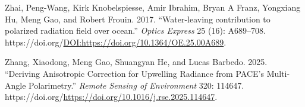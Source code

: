 \documentclass[
  letterpaper,
  open=any]{scrbook}
\newlength{\cslhangindent}
\newenvironment{CSLReferences}[2] %
 {\begin{list}{}{%
  \setlength{\itemindent}{0pt}
  \setlength{\leftmargin}{0pt}
  \setlength{\parsep}{0pt}
  \ifodd #1
   \setlength{\leftmargin}{\cslhangindent}
   \setlength{\itemindent}{-1\cslhangindent}
  \fi
  \setlength{\itemsep}{#2\baselineskip}}}
 {\end{list}}
\begin{document}
\begin{CSLReferences}{1}{0}
Zhai, Peng-Wang, Kirk Knobelspiesse, Amir Ibrahim, Bryan A Franz,
Yongxiang Hu, Meng Gao, and Robert Frouin. 2017. {``{Water-leaving
contribution to polarized radiation field over ocean}.''} \emph{Optics
Express} 25 (16): A689--708.
https://doi.org/\url{DOI:https://doi.org/10.1364/OE.25.00A689}.

Zhang, Xiaodong, Meng Gao, Shuangyan He, and Lucas Barbedo. 2025.
{``Deriving Anisotropic Correction for Upwelling Radiance from PACE's
Multi-Angle Polarimetry.''} \emph{Remote Sensing of Environment} 320:
114647. https://doi.org/\url{https://doi.org/10.1016/j.rse.2025.114647}.

\end{CSLReferences}


\backmatter
\end{document}
